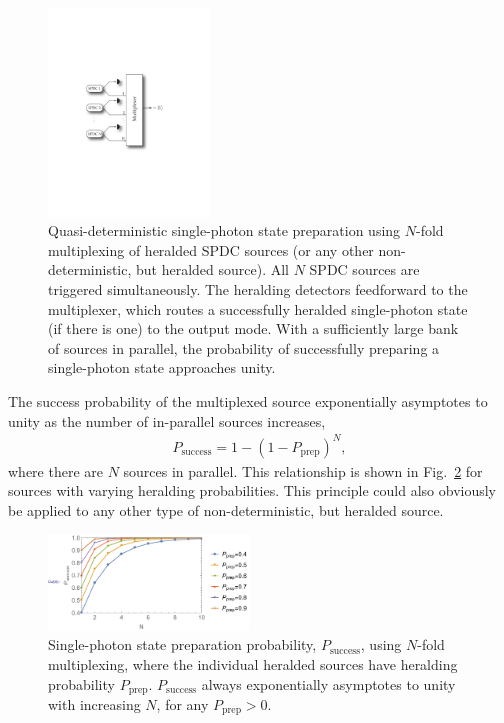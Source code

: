 \begin{figure}[!htbp]
\includegraphics[clip=true, width=0.38\textwidth]{SPDC_multiplexing_arch}
\captionspacefig \caption{Quasi-deterministic single-photon state preparation using $N$-fold multiplexing of heralded SPDC sources (or any other non-deterministic, but heralded source). All $N$ SPDC sources are triggered simultaneously. The heralding detectors feedforward to the multiplexer, which routes a successfully heralded single-photon state (if there is one) to the output mode. With a sufficiently large bank of sources in parallel, the probability of successfully preparing a single-photon state approaches unity.} \label{fig:SPDC_multiplexing_arch}
\end{figure}

The success probability of the multiplexed source exponentially asymptotes to unity as the number of in-parallel sources increases,
\begin{align} \label{eq:SPDC_multiplex}
P_\mathrm{success} = 1 - (1-P_\mathrm{prep})^N,
\end{align}
where there are $N$ sources in parallel. This relationship is shown in Fig.~\ref{fig:SPDC_multiplexing_plot} for sources with varying heralding probabilities. This principle could also obviously be applied to any other type of non-deterministic, but heralded source.

\begin{figure}[!htbp]
\includegraphics[clip=true, width=0.475\textwidth]{SPDC_multiplexing_plot}
\captionspacefig \caption{Single-photon state preparation probability, $P_\mathrm{success}$, using $N$-fold multiplexing, where the individual heralded sources have heralding probability $P_\mathrm{prep}$. $P_\mathrm{success}$ always exponentially asymptotes to unity with increasing $N$, for any \mbox{$P_\mathrm{prep}>0$}.} \label{fig:SPDC_multiplexing_plot}
\end{figure}


